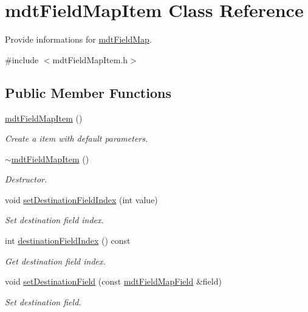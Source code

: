 \hypertarget{classmdt_field_map_item}{\section{mdt\-Field\-Map\-Item Class Reference}
\label{classmdt_field_map_item}
}


Provide informations for \hyperlink{classmdt_field_map}{mdt\-Field\-Map}.  




{\ttfamily \#include $<$mdt\-Field\-Map\-Item.\-h$>$}

\subsection*{Public Member Functions}
\begin{DoxyCompactItemize}
\item 
\hyperlink{classmdt_field_map_item_a36e1f695842b8ba275f535db80fc8033}{mdt\-Field\-Map\-Item} ()
\begin{DoxyCompactList}\small\item\em Create a item with default parameters. \end{DoxyCompactList}\item 
\hyperlink{classmdt_field_map_item_a8b0a74671b7ade65d8d17274727b2269}{$\sim$mdt\-Field\-Map\-Item} ()
\begin{DoxyCompactList}\small\item\em Destructor. \end{DoxyCompactList}\item 
void \hyperlink{classmdt_field_map_item_af49fa592e62430611222450aa8e60549}{set\-Destination\-Field\-Index} (int value)
\begin{DoxyCompactList}\small\item\em Set destination field index. \end{DoxyCompactList}\item 
int \hyperlink{classmdt_field_map_item_ac5fc1ed4a1ef485d4d6727603b247000}{destination\-Field\-Index} () const 
\begin{DoxyCompactList}\small\item\em Get destination field index. \end{DoxyCompactList}\item 
void \hyperlink{classmdt_field_map_item_a4bbd4dba1292f825d96c3eef232620fc}{set\-Destination\-Field} (const \hyperlink{classmdt_field_map_field}{mdt\-Field\-Map\-Field} \&field)
\begin{DoxyCompactList}\small\item\em Set destination field. \end{DoxyCompactList}\item 

\end{DoxyCompactItemize}
